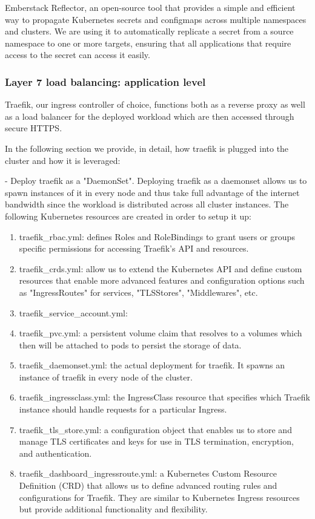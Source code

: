 Emberstack Reflector, an open-source tool that provides a simple and efficient way to propagate Kubernetes secrets and configmaps across multiple namespaces and clusters. We are using it to automatically replicate a secret from a source namespace to one or more targets, ensuring that all applications that require access to the secret can access it easily.

\subsubsection{Layer 7 load balancing: application level }

Traefik, our ingress controller of choice, functions both as a reverse proxy as well as a load balancer for the deployed workload which are then accessed through secure HTTPS. 

In the following section we provide, in detail, how traefik is plugged into the cluster and how it is leveraged: 

- Deploy traefik as a "DaemonSet". Deploying traefik as a daemonset allows us to spawn instances of it in every node and thus take full advantage of the internet bandwidth since the workload is distributed across all cluster instances. The following Kubernetes resources are created in order to setup it up:

\begin{enumerate}
\item traefik\_rbac.yml: defines Roles and RoleBindings to grant users or groups specific permissions for accessing Traefik's API and resources.
\item traefik\_crds.yml: allow us to extend the Kubernetes API and define custom resources that enable more advanced features and configuration options such as "IngressRoutes" for services, "TLSStores", "Middlewares", etc.
\item traefik\_service\_account.yml:  
\item traefik\_pvc.yml:  a persistent volume claim that resolves to a volumes which then will be attached to pods to persist the storage of data. 
\item traefik\_daemonset.yml: the actual deployment for traefik. It spawns an instance of traefik in every node of the cluster. 
\item traefik\_ingressclass.yml: the IngressClass resource that specifies which Traefik instance should handle requests for a particular Ingress. 
\item traefik\_tls\_store.yml: a configuration object that enables us to store and manage TLS certificates and keys for use in TLS termination, encryption, and authentication. 
\item traefik\_dashboard\_ingressroute.yml: a Kubernetes Custom Resource Definition (CRD) that allows us to define advanced routing rules and configurations for Traefik. They are similar to Kubernetes Ingress resources but provide additional functionality and flexibility. 
\end{enumerate}


